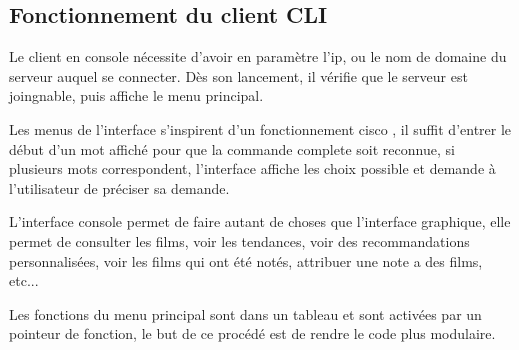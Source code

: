 % 
\subsection{Fonctionnement du client CLI}
Le client en console nécessite d'avoir en paramètre l'ip, ou le nom de domaine du serveur auquel se connecter. Dès son lancement, il vérifie que le serveur est joingnable, puis affiche le menu principal.\par
Les menus de l'interface s'inspirent d'un fonctionnement \og cisco \fg, il suffit d'entrer le début d'un mot affiché pour que la commande complete soit reconnue, si plusieurs mots correspondent, l'interface affiche les choix possible et demande à l'utilisateur de préciser sa demande.\par
L'interface console permet de faire autant de choses que l'interface graphique, elle permet de consulter les films, voir les tendances, voir des recommandations personnalisées, voir les films qui ont été notés, attribuer une note a des films, etc...\par
Les fonctions du menu principal sont dans un tableau et sont activées par un pointeur de fonction, le but de ce procédé est de rendre le code plus modulaire.\par
% 
